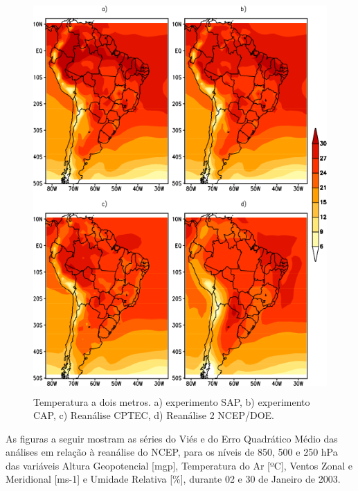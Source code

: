 \begin{figure}[!hbp]
\centering
\includegraphics[height=15cm]{./figs/media_tp2m_anl.png}
\caption{Temperatura a dois metros. a) experimento SAP, b) experimento CAP, c) Reanálise CPTEC, d) Reanálise 2 NCEP/DOE.}
\label{fig42}
\end{figure}

As figuras a seguir mostram as séries do Viés e do Erro Quadrático Médio das análises em relação à reanálise do NCEP, para os níveis de 850, 500 e 250 hPa das variáveis Altura Geopotencial [mgp], Temperatura do Ar [ºC], Ventos Zonal e Meridional [ms-1] e Umidade Relativa [\%], durante 02 e 30 de Janeiro de 2003.

